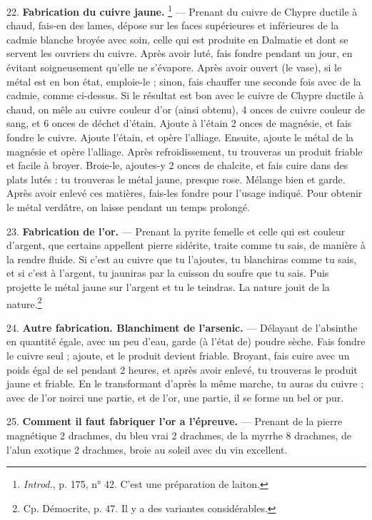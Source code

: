 \documentclass[a4paper, 11pt, oneside, polutonikogreek, french]{article}
\begin{document}
22. \textbf{Fabrication du cuivre jaune.} \footnote{\emph{Introd.}, p. 175, n° 42. C'est une préparation de laiton.} --- Prenant du cuivre de Chypre ductile à chaud, fais-en des lames, dépose sur les faces supérieures et inférieures de la cadmie blanche broyée avec soin, celle qui est produite en Dalmatie et dont se servent les ouvriers du cuivre. Après avoir luté, fais fondre pendant un jour, en évitant soigneusement qu'elle ne s'évapore. Après avoir ouvert (le vase), si le métal est en bon état, emploie-le ; sinon, fais chauffer une seconde fois avec de la cadmie, comme ci-dessus. Si le résultat est bon avec le cuivre de Chypre ductile à chaud, on mêle au cuivre couleur d'or (ainsi obtenu), 4 onces de cuivre couleur de sang, et 6 onces de déchet d'étain. Ajoute à l'étain 2 onces de magnésie, et fais fondre le cuivre. Ajoute l'étain, et opère l'alliage. Ensuite, ajoute le métal de la magnésie et opère l'alliage. Après refroidissement, tu trouveras un produit friable et facile à broyer. Broie-le, ajoutes-y 2 onces de chalcite, et fais cuire dans des plats lutés : tu trouveras le métal jaune, presque rose. Mélange bien et garde. Après avoir enlevé ces matières, fais-les fondre pour l'usage indiqué. Pour obtenir le métal verdâtre, on laisse pendant un temps prolongé.

23. \textbf{Fabrication de l'or.} --- Prenant la pyrite femelle et celle qui est couleur d'argent, que certains appellent pierre sidérite, traite comme tu sais, de manière à la rendre fluide. Si c'est au cuivre que tu l'ajoutes, tu blanchiras comme tu sais, et si c'est à l'argent, tu jauniras par la cuisson du soufre que tu sais. Puis projette le métal jaune sur l'argent et tu le teindras. La nature jouit de la nature.\footnote{Cp. Démocrite, p. 47. Il y a des variantes considérables.}

24. \textbf{Autre fabrication. Blanchiment de l'arsenic.} --- Délayant de l'absinthe en quantité égale, avec un peu d'eau, garde (à l'état de) poudre sèche. Fais fondre le cuivre seul ; ajoute, et le produit devient friable. Broyant, fais cuire avec un poids égal de sel pendant 2 heures, et après avoir enlevé, tu trouveras le produit jaune et friable. En le transformant d'après la même marche, tu auras du cuivre ; avec de l'or noirci une partie, et de l'or, une partie, il se forme un bel or pur.

25. \textbf{Comment il faut fabriquer l'or a l'épreuve.} --- Prenant de la pierre magnétique 2 drachmes, du bleu vrai 2 drachmes, de la myrrhe 8 drachmes, de l'alun exotique 2 drachmes, broie au soleil avec du vin excellent.
\end{document}
